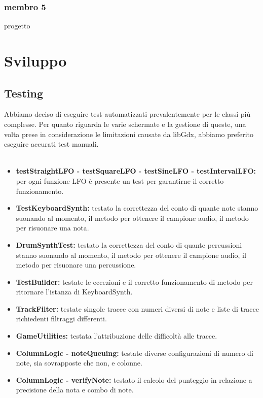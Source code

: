 \documentclass[a4paper,12pt]{report}
\begin{document}
\subsection{membro 5}
progetto 
\newpage



\chapter{Sviluppo}
\section{Testing}
Abbiamo deciso di eseguire test automatizzati prevalentemente per le classi più complesse. Per quanto riguarda le varie schermate e la gestione di queste, una volta prese in considerazione le limitazioni causate da libGdx, abbiamo preferito eseguire accurati test manuali. \\ \\
{
\begin{itemize}
	\item \textbf{testStraightLFO - testSquareLFO - testSineLFO - testIntervalLFO:} per ogni funzione LFO è presente un test per garantirne il corretto funzionamento.	
	\item \textbf{TestKeyboardSynth:} testato la correttezza del conto di quante note stanno suonando al momento, il metodo per ottenere il campione audio, il metodo per risuonare una nota.	
	\item \textbf{DrumSynthTest:} testato la correttezza del conto di quante percussioni stanno suonando al momento, il metodo per ottenere il campione audio, il metodo per risuonare una percussione.	
	\item \textbf{TestBuilder:} testate le eccezioni e il corretto funzionamento di metodo per ritornare l'istanza di KeyboardSynth.
	\item \textbf{TrackFilter:} testate singole tracce con numeri diversi di note e liste di tracce richiedenti filtraggi differenti.	
	\item \textbf{GameUtilities:} testata l'attribuzione delle difficoltà alle tracce.	
	\item \textbf{ColumnLogic - noteQueuing:} testate diverse configurazioni di numero di note, sia sovrapposte che non, e colonne.	
	\item \textbf{ColumnLogic - verifyNote:} testato il calcolo del punteggio in relazione a precisione della nota e combo di note.
\end{itemize}
}
\newpage
\end{document}
